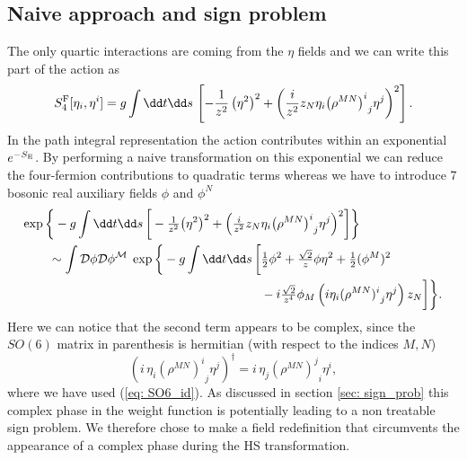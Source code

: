 \subsection{Naive approach and sign problem}
The only quartic interactions are coming from the $\eta$ fields and we can write this part of the action as
%
%
\begin{equation}
S^{\rm F}_{4} [\eta_{i},\eta^{i}] = g \int \dd t \dd s \, \left[-\frac{1}{z^{2}}\left(\eta^{2}\right)^{2} + \left(\frac{i}{z^{2}}z_{N}
\eta_{i}{\left(\rho^{MN}\right)^{i}}_{j}\eta^{j}\right)^{2} \right].
\label{eqq: S_4}
\end{equation}
%
%
In the path integral representation the  action contributes within an exponential $e^{-S_{\rm E}}$. By performing a naive  transformation on this exponential we can reduce the four-fermion contributions to quadratic  terms whereas we have to introduce 7 bosonic real auxiliary fields $\phi$ and $\phi^{N}$
%
%
\begin{align}
\exp \bigg\lbrace -g \int \dd t \dd s \, \bigg[-\tfrac{1}{z^{2}} \big(\eta^{2}\big)^{2} + \Big(\tfrac{i}{z^{2}}z_{N}
& \eta_{i}{\big(\rho^{MN}\big)^{i}}_{j}\eta^{j}\Big)^{2} \bigg] \bigg\rbrace \\
%
%
\sim \int \mathcal{D}\phi \mathcal{D}\mathcal{\phi^{M}}\; \exp\bigg\lbrace -g \int \dd t \dd s \, \bigg[ &\tfrac{1}{2}\phi^{2} + \tfrac{\sqrt{2}}{z}\phi\eta^{2} +\tfrac{1}{2} (\phi^{M})^{2} \notag \\
 &- i\tfrac{\sqrt{2}}{z^{4}} \phi_{M} \left( i\eta_{i}{(\rho^{MN})^{i}}_{j}\eta^{j}\right) z_{N} \bigg] \bigg\rbrace. \notag
\end{align}
%
%
Here we can notice that the second term appears to be complex, since the $SO(6)$ matrix in parenthesis is hermitian (with respect to the indices $M,N$)
%
%
\begin{equation}
\left( i \,\eta_{i} {\left(\rho^{MN}\right)^{i}}_{j}\eta^{j}\right)^{\dagger} = i\, \eta_{j} {\left(\rho^{MN}\right)^{j}}_{i}\eta^{i},
\end{equation}
%
%
where we have used (\ref{eq: SO6_id}). As discussed in section \ref{sec: sign_prob} this complex phase in the weight function is potentially leading to a non treatable sign problem. We therefore chose to make a field redefinition that circumvents the appearance of a complex phase during the HS transformation.
%
%
%
%
%
%
